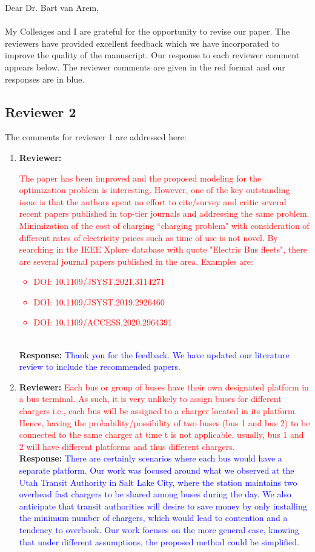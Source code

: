 \documentclass{article}
\newcommand\formatfeedback[2]
{%
	\textbf{Reviewer:} \textcolor{red}{#1} 
	\leavevmode\\[0.1in] \textbf{Response:} \textcolor{blue}{#2}
}
\begin{document}
\noindent Dear Dr. Bart van Arem, \\ \\
My Colleages and I are grateful for the opportunity to revise our paper. The reviewers have provided excellent feedback which we have incorporated to improve the quality of the manuscript. Our response to each reviewer comment appears below. The reviewer comments are given in the red format and our responses are in blue.

\subsection*{Reviewer 2}
The comments for reviewer 1 are addressed here:
\begin{enumerate}
	\item \formatfeedback{The paper has been improved and the proposed modeling for the optimization problem is interesting. However, one of the key outstanding issue is that the authors spent no effort to cite/survey and critic several recent papers published in top-tier journals and addressing the same problem. Minimization of the cost of charging ``charging problem" with consideration of different rates of electricity prices such as time of use is not novel. By searching in the IEEE Xplore database with quote "Electric Bus fleets", there are several journal papers published in the area. Examples are:
\begin{itemize}
	\item DOI: 10.1109/JSYST.2021.3114271
	\item DOI: 10.1109/JSYST.2019.2926460
	\item DOI: 10.1109/ACCESS.2020.2964391
\end{itemize}
}{Thank you for the feedback. We have updated our literature review to include the recommended papers.}
	\item \formatfeedback{Each bus or group of buses have their own designated platform in a bus terminal. As such, it is very unlikely to assign buses for different chargers i.e., each bus will be assigned to a charger located in its platform. Hence, having the probability/possibility of  two buses (bus 1 and bus 2) to be connected to the same charger at time t is not applicable. usually, bus 1 and 2 will have different platforms and thus different chargers.}{There are certainly scenarios where each bus would have a separate platform. Our work was focused around what we observed at the Utah Transit Authority in Salt Lake City, where the station maintains two overhead fast chargers to be shared among buses during the day. We also anticipate that transit authorities will desire to save money by only installing the minimum number of chargers, which would lead to contention and a tendency to overbook. Our work focuses on the more general case, knowing that under different assumptions, the proposed method could be simplified.}

\end{enumerate}
\end{document}
